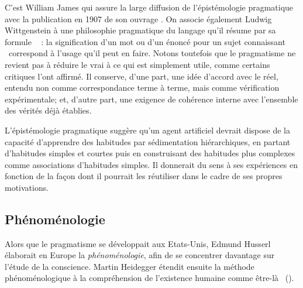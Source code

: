 

C'est William James qui assure la large diffusion de l'épistémologie pragmatique avec la publication en 1907 de son ouvrage  \cite{james_pragmatism_2004}.
On associe également Ludwig Wittgenstein à une philosophie pragmatique du langage qu'il résume par sa formule \og {} \fg\  \cite[§43]{wittgenstein_philosophical_1953} : la signification d'un mot ou d'un énoncé pour un \og sujet connaissant \fg\ correspond à l’usage qu'il peut en faire.
Notons toutefois que le pragmatisme ne revient pas à réduire le vrai à ce qui est simplement utile, comme certains critiques l’ont affirmé.
Il conserve, d’une part, une idée d’accord avec le réel, entendu non comme correspondance terme à terme, mais comme vérification expérimentale; et, d’autre part, une exigence de cohérence interne avec l’ensemble des vérités déjà établies.


L'épistémologie pragmatique suggère qu'un agent artificiel devrait dispose de la capacité d'apprendre des habitudes par sédimentation hiérarchiques, en partant d'habitudes simples et courtes puis en construisant des habitudes plus complexes comme associations d'habitudes simples. 
Il donnerait du sens à ses expériences en fonction de la façon dont il pourrait les réutiliser dans le cadre de ses propres motivations. 

\subsection{Phénoménologie}

\noindent
Alors que le pragmatisme se développait aux Etats-Unis, Edmund Husserl élaborait en Europe la \emph{phénoménologie}, afin de se concentrer davantage sur l'étude de la conscience.
Martin Heidegger étendit ensuite la méthode phénoménologique à la compréhension de l'existence humaine comme \og être-là \fg\ (). 

